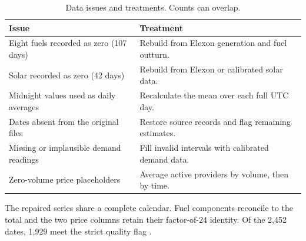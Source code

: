\begin{table}[H]
\centering\small
\caption{Data issues and treatments. Counts can overlap.}
\label{tab:repair}
\begin{tabularx}{\linewidth}{@{}P{.44\linewidth}Y@{}}
\toprule
Issue & Treatment \\
\midrule
Eight fuels recorded as zero (107 days) &
Rebuild from Elexon generation and fuel outturn. \\
\addlinespace[2pt]
Solar recorded as zero (42 days) &
Rebuild from Elexon or calibrated solar data. \\
\addlinespace[2pt]
Midnight values used as daily averages &
Recalculate the mean over each full UTC day. \\
\addlinespace[2pt]
Dates absent from the original files &
Restore source records and flag remaining estimates. \\
\addlinespace[2pt]
Missing or implausible demand readings &
Fill invalid intervals with calibrated demand data. \\
\addlinespace[2pt]
Zero-volume price placeholders &
Average active providers by volume, then by time. \\
\bottomrule
\end{tabularx}
\end{table}

The repaired series share a complete calendar. Fuel components reconcile
to the total and the two price columns retain their factor-of-24 identity.
Of the 2,452 dates, 1,929 meet the strict quality flag \cite{repair}.
